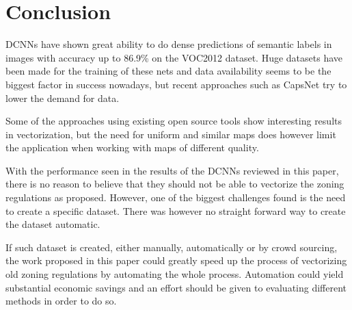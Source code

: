 \chapter{Conclusion}
DCNNs have shown great ability to do dense predictions of semantic labels in images with accuracy up to 86.9\% on the VOC2012 dataset. Huge datasets have been made for the training of these nets and data availability seems to be the biggest factor in success nowadays, but recent approaches such as CapsNet \cite{Sabour2017} try to lower the demand for data.

Some of the approaches using existing open source tools show interesting results in vectorization, but the need for uniform and similar maps does however limit the application when working with maps of different quality.

With the performance seen in the results of the DCNNs reviewed in this paper, there is no reason to believe that they should not be able to vectorize the zoning regulations as proposed. However, one of the biggest challenges found is the need to create a specific dataset. There was however no straight forward way to create the dataset automatic.

If such dataset is created, either manually, automatically or by crowd sourcing, the work proposed in this paper could greatly speed up the process of vectorizing old zoning regulations by automating the whole process. Automation could yield substantial economic savings and an effort should be given to evaluating different methods in order to do so.